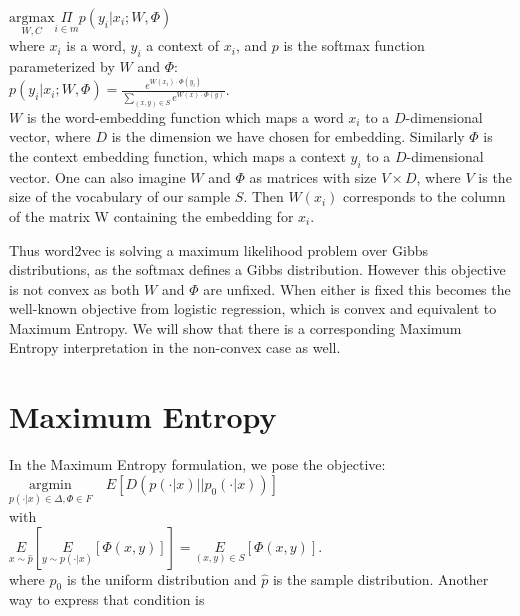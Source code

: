 \documentclass[]{article}
\begin{document}
$\underset{W,C}{\text{argmax}} \underset{i \in m}{\Pi}{p(y_i|x_i; W, \Phi)}$\\

\noindent where $x_i$ is a word, $y_i$ a context of $x_i$, and $p$ is the softmax function parameterized by $W$ and $\Phi$:\\

$p(y_i|x_i; W,\Phi) = \frac{e^{W(x_i) \cdot \Phi(y_i)}}{\sum_{(x,y) \in S}e^{W(x) \cdot \Phi(y)}}$.\\

$W$ is the word-embedding function which maps a word $x_i$ to a $D$-dimensional vector, where $D$ is the dimension we have chosen for embedding. Similarly $\Phi$ is the context embedding function, which maps a context $y_i$ to a $D$-dimensional vector. One can also imagine $W$ and $\Phi$ as matrices with size $V \times D$, where $V$ is the size of the vocabulary of our sample $S$. Then $W(x_i)$ corresponds to the column of the matrix W containing the embedding for $x_i$.

Thus word2vec is solving a maximum likelihood problem over Gibbs distributions, as the softmax defines a Gibbs distribution. However this objective is not convex as both $W$ and $\Phi$ are unfixed. When either is fixed this becomes the well-known objective from logistic regression, which is convex and equivalent to Maximum Entropy\cite{dummy}. We will show that there is a corresponding Maximum Entropy interpretation in the non-convex case as well. 

\section{Maximum Entropy}

In the Maximum Entropy formulation, we pose the objective:\\

$\underset{p(\cdot | x) \in \Delta, \Phi \in F}{\text{argmin}} \quad E \left[D(p(\cdot|x) \vert \vert  p_0(\cdot|x))\right]$\\

\noindent with\\

$\underset{x \sim \hat{p}}{E}\left[\underset{y \sim p(\cdot|x)}{E}\left[\Phi(x,y)\right]\right] = \underset{(x,y) \in S}{E}\left[\Phi(x,y)\right]$.\\

\noindent where $p_0$ is the uniform distribution and $\hat{p}$ is the sample distribution. Another way to express that condition is\\
\end{document}
